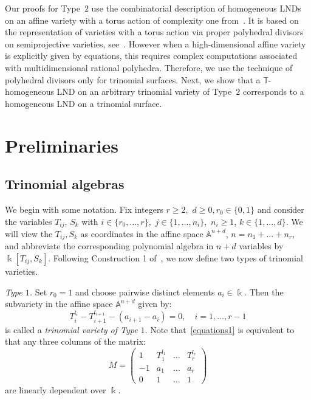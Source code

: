 \documentclass[a4paper,reqno,12pt]{amsart}
\theoremstyle{plain}
\theoremstyle{definition}
\theoremstyle{plain}
\theoremstyle{remark}
\newcommand{\A}{\mathbb A}
\newcommand{\TT}{\mathbb{T}}
\newcommand{\kk}{\Bbbk}
\begin{document}
Our proofs for Type~$2$ use the combinatorial description of homogeneous LNDs on an affine variety with a torus action of complexity one from~\cite{Liendo}. It is based on the representation of varieties with a torus action via proper polyhedral divisors on semiprojective varieties, see~\cite{Altmann-Hausen}. However when a high-dimensional affine variety is explicitly given by equations, this requires complex computations associated with multidimensional rational polyhedra. Therefore, we use the technique of polyhedral divisors only for trinomial surfaces. Next, we show that a ${\TT}$-homogeneous LND on an arbitrary trinomial variety of Type~$2$ corresponds to a homogeneous LND on a trinomial surface.

\section{Preliminaries}
\subsection*{Trinomial algebras}\label{SubsectionTrinomials}
We begin with some notation. Fix integers $r\ge2,$ $d\ge0, r_0\in\{0,1\}$ and consider the variables $T_{ij},\,S_k$ with $i\in\{r_0,\ldots,r\},$ $j\in\{1,\ldots,n_i\},$ $n_i\ge1$, $k\in\{1,\ldots, d\}$. We will view the $T_{ij}, S_k$ as coordinates in the affine space $\A^{n+d}$, $n = n_1+\ldots+n_r$, and abbreviate the corresponding polynomial algebra in $n+d$ variables by $\kk[T_{ij}, S_k]$. Following Construction 1 of~\cite{HW}, we now define two types of trinomial varieties.

\textit{Type $1$.} Set $r_0=1$ and choose pairwise distinct elements $a_i\in\kk$. Then the subvariety in the affine space $\mathbb A^{n+d}$ given by:
\begin{equation}\label{equations1}
    T_i^{l_i}-T_{i+1}^{l_{i+1}} - (a_{i+1}-a_i)=0,\quad i=1,\ldots, r-1
\tag{1.1}
\end{equation}
is called a \emph{trinomial variety of Type $1$}. Note that~\eqref{equations1} is equivalent to that any three columns of the matrix:
$$
M = \begin{pmatrix}
    1 & T_{1}^{l_1}&\ldots&T_r^{l_r}\\
    -1 & a_1 &\ldots & a_r\\
    0 &1&\ldots&1
\end{pmatrix}
$$
are linearly dependent over $\Bbbk$.
\end{document}
